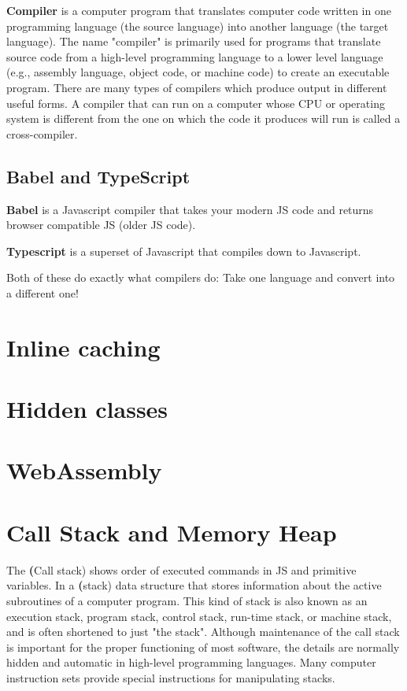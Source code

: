             \textbf{Compiler} is a computer program that translates computer code written in one programming language (the source language) into another language (the target language).
            The name "compiler" is primarily used for programs that translate source code from a high-level programming language to a lower level language (e.g., assembly language, object code, or machine code)
            to create an executable program. There are many types of compilers which produce output in different useful forms. A compiler that can run on a computer whose CPU or operating system is different 
            from the one on which the code it produces will run is called a cross-compiler.
    
    \subsection{Babel and TypeScript}

        \textbf{Babel} is a Javascript compiler that takes your modern JS code and returns  browser compatible JS (older JS code).
        
        \textbf{Typescript} is a superset of Javascript that compiles down to Javascript.

        Both of these do exactly what compilers do: Take one language and convert into a different one!
    
    \section{Inline caching}
    \section{Hidden classes}
    \section{WebAssembly}

    \section{Call Stack and Memory Heap}

        The \textbf(Call stack) shows order of executed commands in JS and primitive variables.
        In a \textbf(stack) data structure that stores information about the active subroutines of a computer program. 
        This kind of stack is also known as an execution stack, program stack, control stack, 
        run-time stack, or machine stack, and is often shortened to just "the stack". 
        Although maintenance of the call stack is important for the proper functioning 
        of most software, the details are normally hidden and automatic in high-level programming languages. 
        Many computer instruction sets provide special instructions for manipulating stacks.

